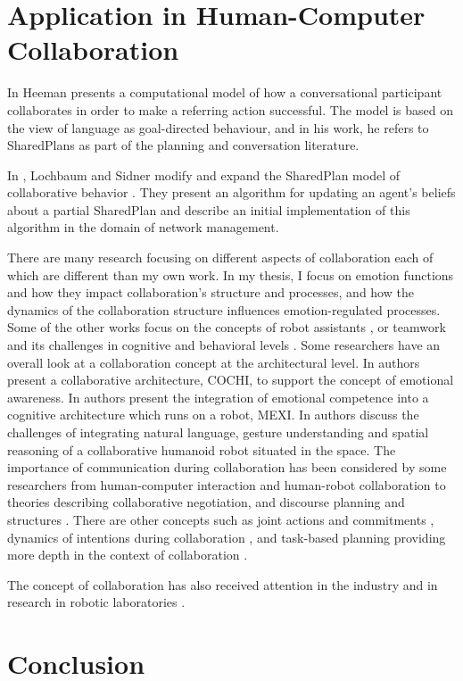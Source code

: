 \documentclass[11pt]{article}
\begin{document}
\section{Application in Human-Computer Collaboration}

In \cite{heeman:model-collaboration-referring} Heeman presents a computational
model of how a conversational participant collaborates in order to make a
referring action successful. The model is based on the view of language as
goal-directed behaviour, and in his work, he refers to SharedPlans as part of
the planning and conversation literature.

In \cite{lochbaum:plan-models}, Lochbaum and Sidner modify and expand the
SharedPlan model of collaborative behavior \cite{grosz:plans-discourse}. They
present an algorithm for updating an agent’s beliefs about a partial SharedPlan
and describe an initial implementation of this algorithm in the domain of
network management.

There are many research focusing
on different aspects of collaboration each of which are different than my own
work. In my thesis, I focus on emotion functions and how they impact
collaboration's structure and processes, and how the dynamics of the
collaboration structure influences emotion-regulated processes. Some of the
other works focus on the concepts of robot assistants
\cite{clancey:agent-assistants-collaboration}, or teamwork and its challenges in
cognitive and behavioral levels \cite{cohen:teamwork,
nikolaidis:collaboration-joint-action, scerri:prototype-distributed-teams,
tambe:flexible-teamwork}. Some researchers have an overall look at a
collaboration concept at the architectural level. In
\cite{garcia:collaboration-emotional-awareness} authors present a collaborative
architecture, COCHI, to support the concept of emotional awareness. In
\cite{esau:integrating-emotion-collaboration} authors present the integration of
emotional competence into a cognitive architecture which runs on a robot, MEXI.
In \cite{sofge:collaboration-humanoid-space} authors discuss the challenges of
integrating natural language, gesture understanding and spatial reasoning of a
collaborative humanoid robot situated in the space. The importance of
communication during collaboration has been considered by some researchers from
human-computer interaction and human-robot collaboration
\cite{clair:action-intention-collaboraiton,
matignon:verbal-nonverbal-collaboration, rich:discourse} to theories describing
collaborative negotiation, and discourse planning and structures
\cite{andriessen:disourse-planning, grosz:discourse-structure,
sidner:discourse-collaborative-negotiation}. There are other concepts such as
joint actions and commitments \cite{grosz:intention-dynamics-collaboration},
dynamics of intentions during collaboration \cite{levesque:acting-together}, and
task-based planning providing more depth in the context of collaboration
\cite{burghart:cognitive-architecture-robot, rich:cea}.

The concept of collaboration has also received attention in the industry and in
research in robotic laboratories \cite{green:collaboration-literature-review}.

\section{Conclusion}



\end{document}
